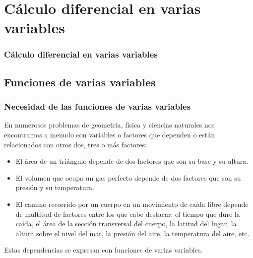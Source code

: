 \section{Cálculo diferencial en varias variables}
\begin{frame}
\frametitle{Cálculo diferencial en varias variables}
\tableofcontents[sectionstyle=show/hide,hideothersubsections]
\end{frame}



\subsection{Funciones de varias variables}
\begin{frame}
\frametitle{Necesidad de las funciones de varias variables}
En numerosos problemas de geometría, física y ciencias naturales nos encontramos a menudo con variables o factores que dependen o están relacionados con otros dos, tres o más factores:
\begin{itemize}
\item El área de un triángulo depende de dos factores que son su base y su altura.
\item El volumen que ocupa un gas perfecto depende de dos factores que son su presión y su temperatura.
\item El camino recorrido por un cuerpo en un movimiento de caída libre depende de multitud de factores entre los que cabe destacar: el tiempo que dure la caída, el área de la sección transversal del cuerpo, la latitud del lugar, la altura sobre el nivel del mar, la presión del aire, la temperatura del aire, etc.
\end{itemize}
Estas dependencias se expresan con funciones de varias variables.
\end{frame}


